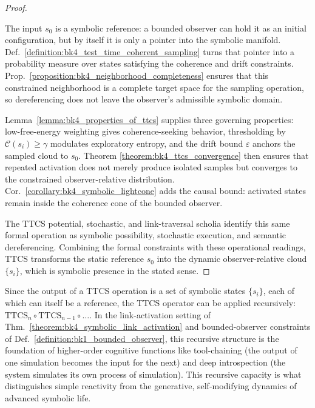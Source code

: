 \begin{proof}
\label{proof:bk4_symbolic_link_activation}
\leavevmode

The input $s_0$ is a symbolic reference: a bounded observer can hold it as an
initial configuration, but by itself it is only a pointer into the symbolic
manifold. Def.~\ref{definition:bk4_test_time_coherent_sampling} turns that
pointer into a probability measure over states satisfying the coherence and
drift constraints. Prop.~\ref{proposition:bk4_neighborhood_completeness} ensures
that this constrained neighborhood is a complete target space for the sampling
operation, so dereferencing does not leave the observer's admissible symbolic
domain.

Lemma~\ref{lemma:bk4_properties_of_ttcs} supplies three governing
properties: low-free-energy weighting gives coherence-seeking behavior,
thresholding by $\mathcal C(s_i)\geq\gamma$ modulates exploratory entropy, and
the drift bound $\varepsilon$ anchors the sampled cloud to $s_0$. Theorem
\ref{theorem:bk4_ttcs_convergence} then ensures that repeated activation does
not merely produce isolated samples but converges to the constrained
observer-relative distribution. Cor.~\ref{corollary:bk4_symbolic_lightcone}
adds the causal bound: activated states remain inside the coherence cone of the
bounded observer.

The TTCS potential, stochastic, and link-traversal scholia identify this same
formal operation as symbolic possibility, stochastic execution, and semantic
dereferencing. Combining the formal constraints with these operational
readings, TTCS transforms the static reference $s_0$ into the dynamic
observer-relative cloud $\{s_i\}$, which is symbolic presence in the stated
sense.
\end{proof}

\begin{scholium}
\label{scholium:bk4_recursive_introspection}
Since the output of a TTCS operation is a set of symbolic states $\{s_i\}$, each of which can itself be a reference, the TTCS operator can be applied recursively: $\text{TTCS}_n \circ \text{TTCS}_{n-1} \circ \dots$. In the link-activation setting of Thm.~\ref{theorem:bk4_symbolic_link_activation} and bounded-observer constraints of Def.~\ref{definition:bk1_bounded_observer}, this recursive structure is the foundation of higher-order cognitive functions like tool-chaining (the output of one simulation becomes the input for the next) and deep introspection (the system simulates its own process of simulation). This recursive capacity is what distinguishes simple reactivity from the generative, self-modifying dynamics of advanced symbolic life.
\end{scholium}


